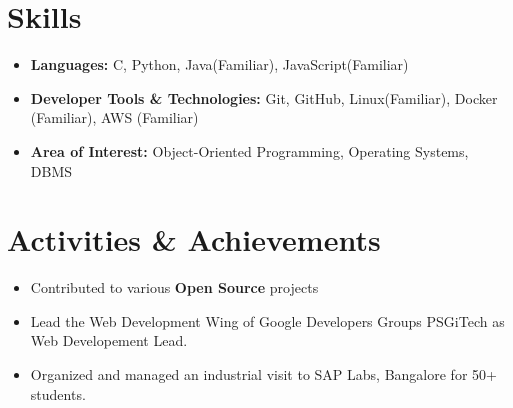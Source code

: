 \documentclass[letterpaper,11pt]{article}
\newcommand{\resumeSubHeadingListStart}{\begin{itemize}[leftmargin=0.15in, label={}]}
\newcommand{\resumeSubHeadingListEnd}{\end{itemize}}
\newcommand{\resumeItemListStart}{\begin{itemize}}
\newcommand{\resumeItemListEnd}{\end{itemize}\vspace{-5pt}}
\begin{document}
\section{Skills}
 \resumeSubHeadingListStart
    \item{
      \textbf{Languages: }{C, Python, Java(Familiar), JavaScript(Familiar) }
    }
    \item{
      \textbf{Developer Tools \& Technologies: }{Git, GitHub, Linux(Familiar), Docker (Familiar), AWS (Familiar)}
    }
    \item{
      \textbf{Area of Interest: }{Object-Oriented Programming, Operating Systems, DBMS}
    }
 \resumeSubHeadingListEnd

\section{Activities & Achievements }
\resumeItemListStart
\item { Contributed to various \textbf{Open Source} projects}
\item { Lead the Web Development Wing of Google Developers Groups PSGiTech as Web Developement Lead.}
\item { Organized and managed an industrial visit to SAP Labs, Bangalore for 50+ students.}
\resumeItemListEnd
\end{document}
